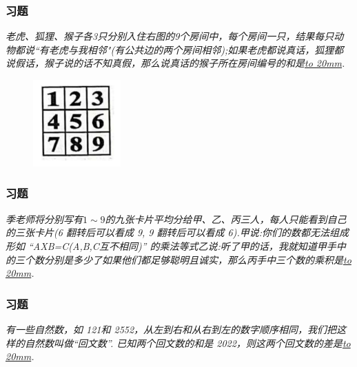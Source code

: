 \begin{frame}
    \frametitle{习题\theframecounter}
    \textit{老虎、狐狸、猴子各3只分别入住右图的9个房间中，每个房间一只，结果每只动物都说“有老虎与我相邻"(有公共边的两个房间相邻);如果老虎都说真话，狐狸都说假话，猴子说的话不知真假，那么说真话的猴子所在房间编号的和是\underline{\hbox to 20mm{}}.}
    \begin{figure}[H] 
        \centering
        \includegraphics[width=0.3\textwidth]{./pics/Chapter_7/4.png}
    \end{figure}
\end{frame}

\begin{frame}
    \frametitle{习题\theframecounter}
    \vspace*{-3cm}
    \textit{季老师将分别写有$1\sim 9$的九张卡片平均分给甲、乙、丙三人，每人只能看到自己的三张卡片(6 翻转后可以看成 9, 9 翻转后可以看成 6).甲说:你们的数都无法组成形如 ``AXB=C(A,B,C互不相同)'' 的乘法等式乙说:听了甲的话，我就知道甲手中的三个数分别是多少了如果他们都足够聪明且诚实，那么丙手中三个数的乘积是\underline{\hbox to 20mm{}}.}
\end{frame}

\begin{frame}
    \frametitle{习题\theframecounter}
    \vspace*{-3cm}
    \textit{有一些自然数，如 121和 2552，从左到右和从右到左的数字顺序相同，我们把这样的自然数叫做“回文数”. 已知两个回文数的和是 2022，则这两个回文数的差是\underline{\hbox to 20mm{}}.}
\end{frame}



